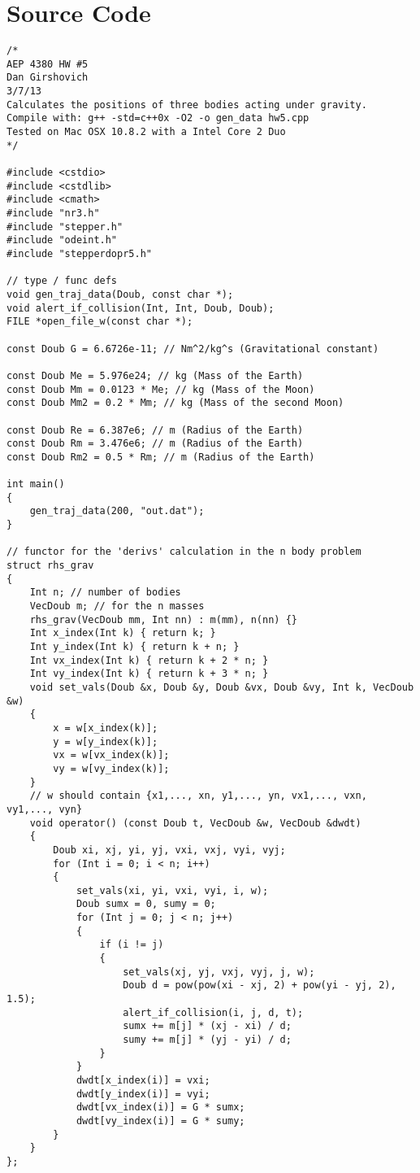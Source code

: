 \documentclass[12pt]{article}
\begin{document}
\section{Source Code}
\begin{lstlisting}
/*
AEP 4380 HW #5
Dan Girshovich
3/7/13
Calculates the positions of three bodies acting under gravity.
Compile with: g++ -std=c++0x -O2 -o gen_data hw5.cpp
Tested on Mac OSX 10.8.2 with a Intel Core 2 Duo
*/

#include <cstdio>
#include <cstdlib>
#include <cmath>
#include "nr3.h"
#include "stepper.h"
#include "odeint.h"
#include "stepperdopr5.h"

// type / func defs
void gen_traj_data(Doub, const char *);
void alert_if_collision(Int, Int, Doub, Doub);
FILE *open_file_w(const char *);

const Doub G = 6.6726e-11; // Nm^2/kg^s (Gravitational constant)

const Doub Me = 5.976e24; // kg (Mass of the Earth)
const Doub Mm = 0.0123 * Me; // kg (Mass of the Moon)
const Doub Mm2 = 0.2 * Mm; // kg (Mass of the second Moon)

const Doub Re = 6.387e6; // m (Radius of the Earth)
const Doub Rm = 3.476e6; // m (Radius of the Earth)
const Doub Rm2 = 0.5 * Rm; // m (Radius of the Earth)

int main()
{
    gen_traj_data(200, "out.dat");
}

// functor for the 'derivs' calculation in the n body problem
struct rhs_grav
{
    Int n; // number of bodies
    VecDoub m; // for the n masses
    rhs_grav(VecDoub mm, Int nn) : m(mm), n(nn) {}
    Int x_index(Int k) { return k; }
    Int y_index(Int k) { return k + n; }
    Int vx_index(Int k) { return k + 2 * n; }
    Int vy_index(Int k) { return k + 3 * n; }
    void set_vals(Doub &x, Doub &y, Doub &vx, Doub &vy, Int k, VecDoub &w)
    {
        x = w[x_index(k)];
        y = w[y_index(k)];
        vx = w[vx_index(k)];
        vy = w[vy_index(k)];
    }
    // w should contain {x1,..., xn, y1,..., yn, vx1,..., vxn, vy1,..., vyn}
    void operator() (const Doub t, VecDoub &w, VecDoub &dwdt)
    {
        Doub xi, xj, yi, yj, vxi, vxj, vyi, vyj;
        for (Int i = 0; i < n; i++)
        {
            set_vals(xi, yi, vxi, vyi, i, w);
            Doub sumx = 0, sumy = 0;
            for (Int j = 0; j < n; j++)
            {
                if (i != j)
                {
                    set_vals(xj, yj, vxj, vyj, j, w);
                    Doub d = pow(pow(xi - xj, 2) + pow(yi - yj, 2), 1.5);
                    alert_if_collision(i, j, d, t);
                    sumx += m[j] * (xj - xi) / d;
                    sumy += m[j] * (yj - yi) / d;
                }
            }
            dwdt[x_index(i)] = vxi;
            dwdt[y_index(i)] = vyi;
            dwdt[vx_index(i)] = G * sumx;
            dwdt[vy_index(i)] = G * sumy;
        }
    }
};


\end{lstlisting}
\end{document}
